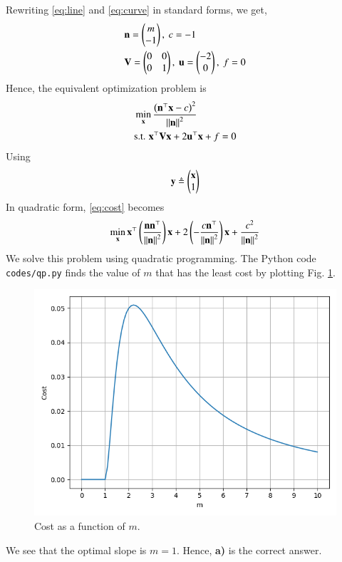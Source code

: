 \documentclass[journal,12pt,twocolumn]{IEEEtran}
\begin{document}
\begin{enumerate}
    \solution Rewriting \eqref{eq:line} and \eqref{eq:curve} in standard forms,
    we get,
    \begin{align}
        &\mathbf{n} = \begin{pmatrix}m\\-1\end{pmatrix},\ c = -1 \label{eq:line-params} \\
        &\mathbf{V} = \begin{pmatrix}0&0\\0&1\end{pmatrix},\ \mathbf{u} = \begin{pmatrix}-2\\0\end{pmatrix},\ f = 0 \label{eq:curve-params}
    \end{align}
    Hence, the equivalent optimization problem is
    \begin{align}
        &\min_{\mathbf{x}} \frac{\left(\mathbf{n}^\top\mathbf{x}-c\right)^2}{\left\lVert\mathbf{n}\right\rVert^2} \label{eq:cost} \\
        &\textrm{s.t. } \mathbf{x}^\top\mathbf{Vx} + 2\mathbf{u}^\top\mathbf{x} + f = 0 \label{eq:constr}
    \end{align}
    Using
    \begin{align}
        \mathbf{y} \triangleq \begin{pmatrix}\mathbf{x}\\1\end{pmatrix} 
        \label{eq:y-def}
    \end{align}
    In quadratic form, \eqref{eq:cost} becomes
    \begin{align}
        \min_{\mathbf{x}} \mathbf{x}^\top\left(\frac{\mathbf{nn}^\top}{\left\lVert\mathbf{n}\right\rVert^2}\right)\mathbf{x} + 2\left(-\frac{c\mathbf{n}^\top}{\left\lVert\mathbf{n}\right\rVert^2}\right)\mathbf{x} + \frac{c^2}{\left\lVert\mathbf{n}\right\rVert^2}
    \end{align}
    We solve this problem using quadratic programming. The Python code 
    \texttt{codes/qp.py} finds the value of $m$ that has the least cost
    by plotting Fig. \ref{fig:qp}. 
    \begin{figure}[!ht]
        \centering
        \includegraphics[width=\columnwidth]{figs/qp.png}
        \caption{Cost as a function of $m$.}
        \label{fig:qp}
    \end{figure}
    We see that the optimal slope is $m = 1$. Hence, \textbf{a)} is the
    correct answer.
\end{enumerate}
\end{document}
